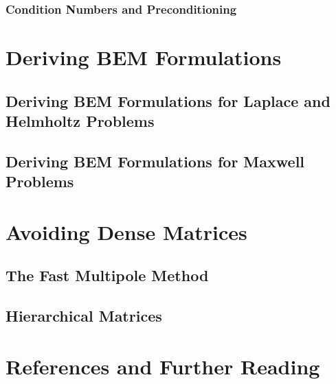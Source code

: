 \documentclass[a4paper]{book}
\begin{document}
\subsection{Condition Numbers and Preconditioning}



\chapter{Deriving BEM Formulations}



\section{Deriving BEM Formulations for Laplace and Helmholtz Problems}



\section{Deriving BEM Formulations for Maxwell Problems}



\chapter{Avoiding Dense Matrices}



\section{The Fast Multipole Method}



\section{Hierarchical Matrices}



\chapter{References and Further Reading}
\end{document}
